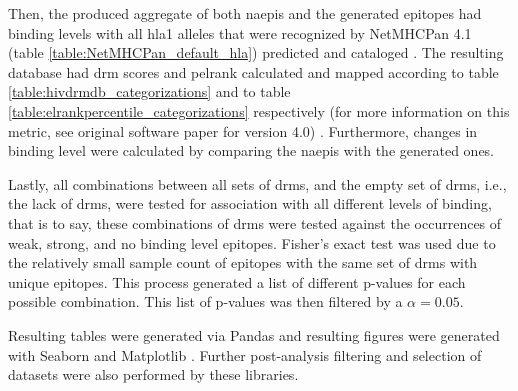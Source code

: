 Then, the produced aggregate of both \acp{naepi} and the generated epitopes had binding levels with all \ac{hla1} alleles that were recognized by NetMHCPan 4.1 (table \ref{table:NetMHCPan_default_hla}) predicted and cataloged \cite{reynissonNetMHCpan4NetMHCIIpan4Improved2020}. The resulting database had \ac{drm} scores and \ac{pelrank} calculated and mapped according to table \ref{table:hivdrmdb_categorizations} and to table \ref{table:elrankpercentile_categorizations} respectively (for more information on this metric, see original software paper for version 4.0) \cite{reynissonNetMHCpan4NetMHCIIpan4Improved2020,jurtzNetMHCpanImprovedPeptideMHC2017}. Furthermore, changes in binding level were calculated by comparing the \acp{naepi} with the generated ones.





Lastly, all combinations between all sets of \acp{drm}, and the empty set of \acp{drm}, i.e., the lack of \acp{drm}, were tested for association with all different levels of binding, that is to say, these combinations of \acp{drm} were tested against the occurrences of weak, strong, and no binding level epitopes. Fisher's exact test was used due to the relatively small sample count of epitopes with the same set of \acp{drm} with unique epitopes. This process generated a list of different p-values for each possible combination. This list of p-values was then filtered by a $\alpha=0.05$.

Resulting tables were generated via Pandas and resulting figures were generated with Seaborn and Matplotlib \cite{the_pandas_development_team_2024_10957263,Waskom2021,hunterMatplotlib2DGraphics2007}. Further post-analysis filtering and selection of datasets were also performed by these libraries.